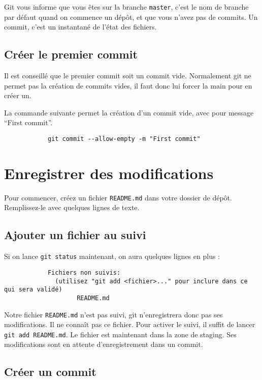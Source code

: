 \documentclass[10pt,a4paper,french]{article}
\begin{document}
    Git vous informe que vous êtes sur la branche \verb|master|, c'est le nom de branche par défaut quand on commence un dépôt, et que vous n'avez pas de commits. Un commit, c'est un instantané de l'état des fichiers.

    \subsection{Créer le premier commit}

        Il est conseillé que le premier commit soit un commit vide. Normalement git ne permet pas la création de commits vides, il faut donc lui forcer la main pour en créer un.

        La commande suivante permet la création d'un commit vide, avec pour message ``First commit''.
        \begin{verbatim}
            git commit --allow-empty -m "First commit"
        \end{verbatim}

\section{Enregistrer des modifications}

    Pour commencer, créez un fichier \verb|README.md| dans votre dossier de dépôt. Remplissez-le avec quelques lignes de texte.

    \subsection{Ajouter un fichier au suivi}

    Si on lance \verb|git status| maintenant, on aura quelques lignes en plus :
        \begin{verbatim}
            Fichiers non suivis:
              (utilisez "git add <fichier>..." pour inclure dans ce qui sera validé)
                    README.md
        \end{verbatim}

        Notre fichier \verb|README.md| n'est pas suivi, git n'enregistrera donc pas ses modifications. Il ne connaît pas ce fichier. Pour activer le suivi, il suffit de lancer \verb|git add README.md|. Le fichier est maintenant dans la zone de staging. Ses modifications sont en attente d'enregistrement dans un commit.

    \subsection{Créer un commit}
\end{document}
